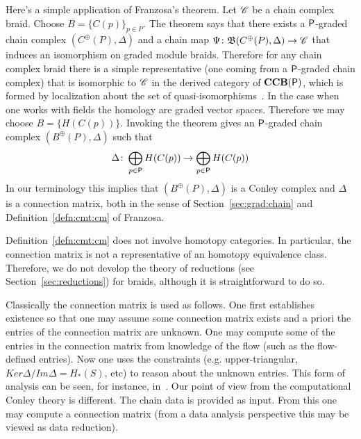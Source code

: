 Here's a simple application of Franzosa's theorem.  Let $\mathscr{C}$ be a chain complex braid.  Choose $B = \{C(p)\}_{p\in P}$.  The theorem says that there exists a ${\mathsf P}$-graded chain complex  $(C^\oplus(P),\Delta)$ and a chain map  $\Psi\colon \mathfrak{B}(C^\oplus(P),\Delta)\to \mathscr{C}$ that induces an isomorphism on graded module braids.  Therefore for any chain complex braid there is a simple representative (one coming from a ${\mathsf P}$-graded chain complex) that is isomorphic to $\mathscr{C}$ in the derived category of ${\bf CCB({\mathsf P})}$, which is formed by localization about the set of quasi-isomorphisms~\cite{weibel}.  In the case when one works with fields the homology are graded vector spaces.  Therefore we may choose $B=\{H(C(p))\}$.  Invoking the theorem gives an ${\mathsf P}$-graded chain complex $(B^\oplus(P),\Delta)$ such that 
\[
\Delta\colon \bigoplus_{p\in {\mathsf P}} H(C(p))\to \bigoplus_{p\in {\mathsf P}} H(C(p))
\] 
 In our terminology this implies that $(B^\oplus(P),\Delta)$ is a Conley complex and $\Delta$ is a connection matrix, both in the sense of Section~\ref{sec:grad:chain} and Definition~\ref{defn:cmt:cm} of Franzosa.
 
 
 \begin{rem}

Definition~\ref{defn:cmt:cm} does not involve homotopy categories.  In particular, the connection matrix is not a representative of an homotopy equivalence class.  Therefore, we do not develop the theory of reductions (see Section~\ref{sec:reductions}) for braids, although it is straightforward to do so.
\end{rem}
 

\begin{rem}
Classically the connection matrix is used as follows.  One first establishes existence so that one may assume some connection matrix exists and a priori the entries of the connection matrix are unknown.  One may compute some of the entries in the connection matrix from knowledge of the flow (such as the flow-defined entries).  Now one uses the constraints (e.g. upper-triangular, $Ker\Delta/Im\Delta = H_*(S)$, etc) to reason about the unknown entries.  This form of analysis can be seen, for instance, in~\cite{}.  Our point of view from the computational Conley theory is different.  The chain data is provided as input.  From this one may compute a connection matrix (from a data analysis perspective this may be viewed as data reduction). 
\end{rem}


